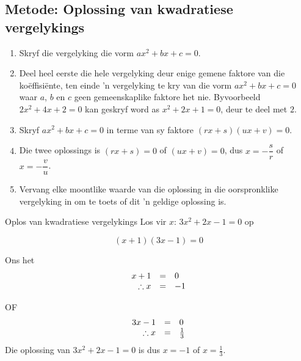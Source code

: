 \subsection*{Metode: Oplossing van kwadratiese vergelykings}
\begin{enumerate}[noitemsep, label=\textbf{\arabic*}. ] 
\item Skryf die vergelyking die vorm $ax^{2} +bx +c =0$.
\item Deel heel eerste die hele vergelyking deur enige gemene faktore van die koëffisiënte, ten einde ’n vergelyking te kry van die vorm $a{x}^{2}+bx+c=0$ waar $a$, $b$ en
$c$ geen gemeenskaplike faktore het nie. Byvoorbeeld $2{x}^{2}+4x+2=0$ kan geskryf word as
${x}^{2}+2x+1=0$, deur te deel met $2$.
\item Skryf $a{x}^{2}+bx+c=0$ in terme van sy faktore  $(rx+s)(ux+v)=0$.

\item Die twee oplossings is $(rx+s)=0$ of $(ux+v)=0$, dus $x = -\dfrac{s}{r}$ of $x=-\dfrac{v}{u}$.
\item Vervang elke moontlike waarde van die oplossing in die oorspronklike vergelyking in om te toets of dit ’n
geldige oplossing is.

\end{enumerate}

        
\begin{wex}
{Oplos van kwadratiese vergelykings }
{Los vir $x$: $3{x}^{2}+2x-1=0$ op}
{

\begin{equation*}
(x+1)(3x-1)=0
\end{equation*}

Ons het
\begin{equation*}
     \begin{array}{ccc}\hfill x+1&=&0\hfill \\
	\hfill \therefore x&=&-1
    \end{array}
\end{equation*}

OF
\begin{equation*}
     \begin{array}{ccc}\hfill 3x-1&=&0\hfill \\
	\hfill \therefore x&=&\frac{1}{3}
    \end{array}
\end{equation*}
Die oplossing van $3{x}^{2}+2x-1=0$ is dus $x=-1$ of $x=\frac{1}{3}$.
}
\end{wex}


